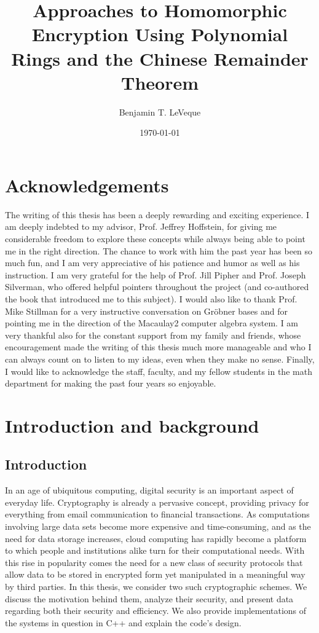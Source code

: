 \documentclass[11pt]{report}
\title{Approaches to Homomorphic Encryption Using Polynomial Rings and the Chinese Remainder Theorem}
\author{Benjamin T. LeVeque}
\date{\today}
\begin{document}
\maketitle


\tableofcontents

\newpage

\chapter{Acknowledgements}
The writing of this thesis has been a deeply rewarding and exciting experience. I am deeply indebted to my advisor, Prof. Jeffrey Hoffstein, for giving me considerable freedom to explore these concepts while always being able to point me in the right direction. The chance to work with him the past year has been so much fun, and I am very appreciative of his patience and humor as well as his instruction. I am very grateful for the help of Prof. Jill Pipher and Prof. Joseph Silverman, who offered helpful pointers throughout the project (and co-authored the book that introduced me to this subject). I would also like to thank Prof. Mike Stillman for a very instructive conversation on Gr\"obner bases and for pointing me in the direction of the Macaulay2 computer algebra system. I am very thankful also for the constant support from my family and friends, whose encouragement made the writing of this thesis much more manageable and who I can always count on to listen to my ideas, even when they make no sense.  Finally, I would like to acknowledge the staff, faculty, and my fellow students in the math department for making the past four years so enjoyable.

\chapter{Introduction and background}

\section{Introduction}

In an age of ubiquitous computing, digital security is an important aspect of everyday life. Cryptography is already a pervasive concept, providing privacy for everything from email communication to financial transactions. As computations involving large data sets become more expensive and time-consuming, and as the need for data storage increases, cloud computing has rapidly become a platform to which people and institutions alike turn for their computational needs. With this rise in popularity comes the need for a new class of security protocols that allow data to be stored in encrypted form yet manipulated in a meaningful way by third parties. In this thesis, we consider two such cryptographic schemes. We discuss the motivation behind them, analyze their security, and present data regarding both their security and efficiency. We also provide implementations of the systems in question in C++ and explain the code's design.
\end{document}
